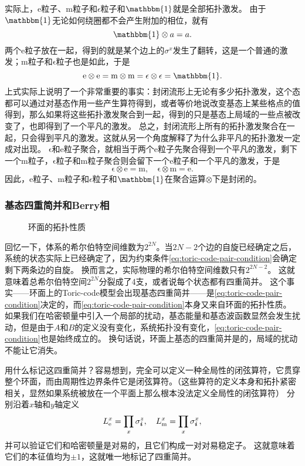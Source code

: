 实际上，e粒子、m粒子和$\epsilon$粒子和$\mathbbm{1}$就是全部拓扑激发。
由于$\mathbbm{1}$无论如何绕圈都不会产生附加的相位，就有
\[
    \mathbbm{1} \otimes a = a.
\]
两个e粒子放在一起，得到的就是某个边上的$\sigma^x$发生了翻转，这是一个普通的激发；m粒子和$\mathrm{\epsilon}$粒子也是如此，于是
\[
    \mathrm{e} \otimes \mathrm{e} = \mathrm{m} \otimes \mathrm{m} = \mathrm{\epsilon} \otimes \mathrm{\epsilon} = \mathbbm{1}.
\]
上式实际上说明了一个非常重要的事实：封闭流形上无论有多少拓扑激发，这个态都可以通过对基态作用一些产生算符得到，或者等价地说改变基态上某些格点的值得到，那么如果将这些拓扑激发聚合到一起，得到的只是基态上局域的一些点被改变了，也即得到了一个平凡的激发。
总之，封闭流形上所有的拓扑激发聚合在一起，只会得到平凡的激发。这就从另一个角度解释了为什么非平凡的拓扑激发一定成对出现。
$\mathrm{\epsilon}$和e粒子聚合，就相当于两个e粒子先聚合得到一个平凡的激发，剩下一个m粒子，$\mathrm{\epsilon}$粒子和m粒子聚合则会留下一个e粒子和一个平凡的激发，于是
\[
    \mathrm{\epsilon} \otimes \mathrm{e} = \mathrm{m}, \quad \mathrm{\epsilon} \otimes \mathrm{m} = \mathrm{e}.
\]
因此，e粒子、m粒子和$\epsilon$粒子和$\mathbbm{1}$在聚合运算$\otimes$下是封闭的。

\subsubsection{基态四重简并和Berry相}

\begin{figure}
    \centering
    \caption{环面的拓扑性质}
\end{figure}

回忆一下，体系的希尔伯特空间维数为$2^{2N}$。当$2N-2$个边的自旋已经确定之后，系统的状态实际上已经确定了，因为约束条件\eqref{eq:toric-code-pair-condition}会确定剩下两条边的自旋。
换而言之，实际物理的希尔伯特空间维数只有$2^{2N-2}$。
这就意味着总希尔伯特空间$2^{2N}$分裂成了4支，或者说每个状态都有四重简并。
这个事实——环面上的Toric-code模型会出现基态四重简并——是\eqref{eq:toric-code-pair-condition}决定的，而\eqref{eq:toric-code-pair-condition}本身又来自环面的拓扑性质。
如果我们在哈密顿量中引入一个局部的扰动，基态能量和基态波函数显然会发生扰动，但是由于${A}$和${B}$的定义没有变化，系统拓扑没有变化，\eqref{eq:toric-code-pair-condition}也是始终成立的。
换句话说，环面上基态的四重简并是的，局域的扰动不能让它消失。

用什么标记这四重简并？容易想到，完全可以定义一种全局性的闭弦算符，它贯穿整个环面，而由周期性边界条件它是闭弦算符。（这些算符的定义本身和拓扑紧密相关，显然如果系统被放在一个平面上那么根本没法定义全局性的闭弦算符）
分别沿着$x$轴和$y$轴定义
\begin{equation}
    {L}^x_\text{e} = \prod_{x} {\sigma}^z_{\vb*{i}}, \quad {L}^x_\text{m} = \prod_{x} {\sigma}^x_{\vb*{i}},
\end{equation}
并可以验证它们和哈密顿量是对易的，且它们构成一对对易稳定子。
这就意味着它们的本征值均为$\pm 1$，这就唯一地标记了四重简并。

